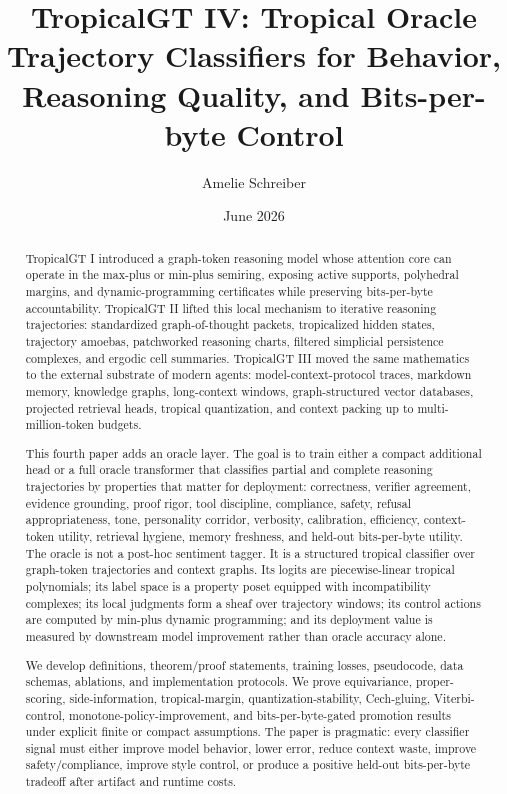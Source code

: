 \documentclass[11pt]{article}
\title{\vspace{-1.5em}\textbf{TropicalGT IV: Tropical Oracle Trajectory Classifiers for Behavior, Reasoning Quality, and Bits-per-byte Control}}
\author{Amelie Schreiber}
\date{June 2026}
\theoremstyle{definition}
\theoremstyle{remark}
\numberwithin{equation}{section}
\begin{document}
\maketitle

\begin{abstract}
TropicalGT I introduced a graph-token reasoning model whose attention core can operate in the max-plus or min-plus semiring, exposing active supports, polyhedral margins, and dynamic-programming certificates while preserving bits-per-byte accountability. TropicalGT II lifted this local mechanism to iterative reasoning trajectories: standardized graph-of-thought packets, tropicalized hidden states, trajectory amoebas, patchworked reasoning charts, filtered simplicial persistence complexes, and ergodic cell summaries. TropicalGT III moved the same mathematics to the external substrate of modern agents: model-context-protocol traces, markdown memory, knowledge graphs, long-context windows, graph-structured vector databases, projected retrieval heads, tropical quantization, and context packing up to multi-million-token budgets.

This fourth paper adds an oracle layer.  The goal is to train either a compact additional head or a full oracle transformer that classifies partial and complete reasoning trajectories by properties that matter for deployment: correctness, verifier agreement, evidence grounding, proof rigor, tool discipline, compliance, safety, refusal appropriateness, tone, personality corridor, verbosity, calibration, efficiency, context-token utility, retrieval hygiene, memory freshness, and held-out bits-per-byte utility.  The oracle is not a post-hoc sentiment tagger.  It is a structured tropical classifier over graph-token trajectories and context graphs.  Its logits are piecewise-linear tropical polynomials; its label space is a property poset equipped with incompatibility complexes; its local judgments form a sheaf over trajectory windows; its control actions are computed by min-plus dynamic programming; and its deployment value is measured by downstream model improvement rather than oracle accuracy alone.

We develop definitions, theorem/proof statements, training losses, pseudocode, data schemas, ablations, and implementation protocols.  We prove equivariance, proper-scoring, side-information, tropical-margin, quantization-stability, Cech-gluing, Viterbi-control, monotone-policy-improvement, and bits-per-byte-gated promotion results under explicit finite or compact assumptions.  The paper is pragmatic: every classifier signal must either improve model behavior, lower error, reduce context waste, improve safety/compliance, improve style control, or produce a positive held-out bits-per-byte tradeoff after artifact and runtime costs.
\end{abstract}
\end{document}
